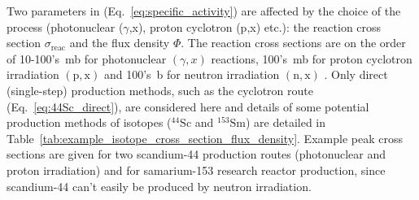 \documentclass[../main.tex]{subfiles}
\begin{document}
Two parameters in (Eq.~\ref{eq:specific_activity}) are affected by the choice of the process (photonuclear ($\gamma$,x), proton cyclotron (p,x) etc.): the reaction cross section $\sigma_{\mathrm{reac}}$ and the flux density $\Phi$. The reaction cross sections are on the order of 10-100's~\si{\milli\barn} for photonuclear $\left(\gamma,x\right)$ reactions, 100's~\si{\milli\barn} for proton cyclotron irradiation $\left(\mathrm{p},\mathrm{x}\right)$ and 100's~\si{\barn} for neutron irradiation $\left(\mathrm{n},\mathrm{x}\right)$ \cite{zerkin2018experimental}. Only direct (single-step) production methods, such as the cyclotron route (Eq.~\ref{eq:44Sc_direct}), are considered here and details of some potential production methods of isotopes ($^{44}\mathrm{Sc}$ and $^{153}\mathrm{Sm}$) are detailed in Table~\ref{tab:example_isotope_cross_section_flux_density}. Example peak cross sections are given for two scandium-44 production routes (photonuclear and proton irradiation) and for samarium-153 research reactor production, since scandium-44 can't easily be produced by neutron irradiation.
\end{document}
